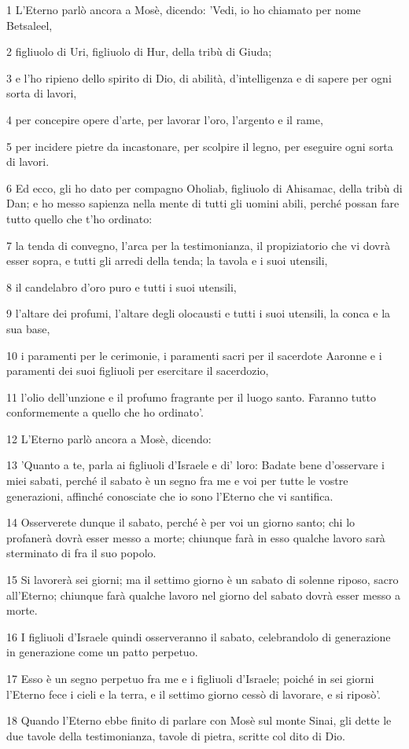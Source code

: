 \par 1 L'Eterno parlò ancora a Mosè, dicendo: 'Vedi, io ho chiamato per nome Betsaleel,
\par 2 figliuolo di Uri, figliuolo di Hur, della tribù di Giuda;
\par 3 e l'ho ripieno dello spirito di Dio, di abilità, d'intelligenza e di sapere per ogni sorta di lavori,
\par 4 per concepire opere d'arte, per lavorar l'oro, l'argento e il rame,
\par 5 per incidere pietre da incastonare, per scolpire il legno, per eseguire ogni sorta di lavori.
\par 6 Ed ecco, gli ho dato per compagno Oholiab, figliuolo di Ahisamac, della tribù di Dan; e ho messo sapienza nella mente di tutti gli uomini abili, perché possan fare tutto quello che t'ho ordinato:
\par 7 la tenda di convegno, l'arca per la testimonianza, il propiziatorio che vi dovrà esser sopra, e tutti gli arredi della tenda; la tavola e i suoi utensili,
\par 8 il candelabro d'oro puro e tutti i suoi utensili,
\par 9 l'altare dei profumi, l'altare degli olocausti e tutti i suoi utensili, la conca e la sua base,
\par 10 i paramenti per le cerimonie, i paramenti sacri per il sacerdote Aaronne e i paramenti dei suoi figliuoli per esercitare il sacerdozio,
\par 11 l'olio dell'unzione e il profumo fragrante per il luogo santo. Faranno tutto conformemente a quello che ho ordinato'.
\par 12 L'Eterno parlò ancora a Mosè, dicendo:
\par 13 'Quanto a te, parla ai figliuoli d'Israele e di' loro: Badate bene d'osservare i miei sabati, perché il sabato è un segno fra me e voi per tutte le vostre generazioni, affinché conosciate che io sono l'Eterno che vi santifica.
\par 14 Osserverete dunque il sabato, perché è per voi un giorno santo; chi lo profanerà dovrà esser messo a morte; chiunque farà in esso qualche lavoro sarà sterminato di fra il suo popolo.
\par 15 Si lavorerà sei giorni; ma il settimo giorno è un sabato di solenne riposo, sacro all'Eterno; chiunque farà qualche lavoro nel giorno del sabato dovrà esser messo a morte.
\par 16 I figliuoli d'Israele quindi osserveranno il sabato, celebrandolo di generazione in generazione come un patto perpetuo.
\par 17 Esso è un segno perpetuo fra me e i figliuoli d'Israele; poiché in sei giorni l'Eterno fece i cieli e la terra, e il settimo giorno cessò di lavorare, e si riposò'.
\par 18 Quando l'Eterno ebbe finito di parlare con Mosè sul monte Sinai, gli dette le due tavole della testimonianza, tavole di pietra, scritte col dito di Dio.

